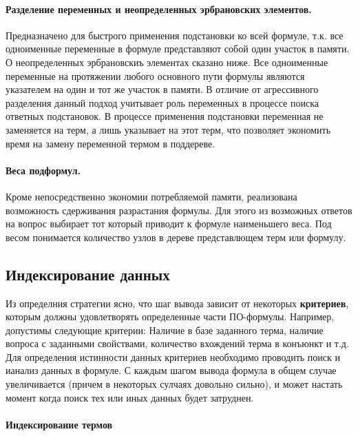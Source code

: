 \paragraph{Разделение переменных и неопределенных эрбрановских элементов.} Предназначено для быстрого применения подстановки ко всей формуле, т.к. все одноименные переменные в формуле представляют собой один участок в памяти. О неопределенных эрбрановскиъ элементах сказано ниже. Все одноименные переменные на протяжении любого основного пути формулы \cite{dissChe} являются указателем на один и тот же участок в памяти. В отличие от агрессивного разделения данный подход учитывает роль переменных в процессе поиска ответных подстановок. В процессе применения подстановки переменная не заменяется на терм, а лишь указывает на этот терм, что позволяет экономить время на замену переменной термом в поддереве. 

\paragraph{Веса подформул.} Кроме непосредственно экономии потребляемой памяти, реализована возможность сдерживания разрастания формулы. Для этого из возможных ответов на вопрос выбирает тот который приводит к формуле наименьшего веса. Под весом понимается количество узлов в дереве представлющем терм или формулу.


\subsection{Индексирование данных}

Из определния стратегии ясно, что шаг вывода зависит от некоторых \textbf{критериев}, которым должны удовлетворять определенные части ПО-формулы. Например, допустимы следующие критерии: Наличие в базе заданного терма, наличие вопроса с заданными свойствами, количество вхождений терма в конъюнкт и т.д. Для определения истинности данных критериев необходимо проводить поиск и ианализ данных в формуле. С каждым шагом вывода формула в общем случае увеличивается (причем в некоторых сулчаях довольно сильно), и может настать момент когда поиск тех или иных данных будет затруднен. 

\paragraph{Индексирование термов} 

